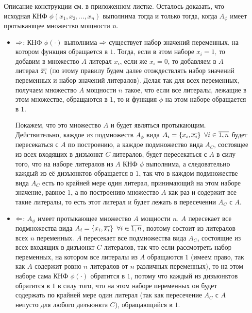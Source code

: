 \documentclass[a4paper,12pt]{article}
\begin{document}
\begin{solution}
	
	Описание конструкции см. в приложенном листке. Осталось доказать, что исходная
	КНФ $\phi(x_1, x_2, \ldots, x_n)$ выполнима тогда и только тогда, когда $A_\phi$ имеет протыкающее множество мощности $n$.
	
	\begin{itemize}
		\item $\Rightarrow$: КНФ $\phi(\cdot)$ выполнима $\Rightarrow$ существует набор значений переменных, на котором функция обращается в $1$. Тогда, если в этом наборе $x_i = 1$, то добавим в множество $A$ литерал $x_i$, если же $x_i = 0$, то добавляем в $A$ литерал $\overline{x_i}$ (по этому правилу будем далее отождествлять набор значений переменных и набор значений литералов). Делая так для всех переменных, получаем множество $A$ мощности $n$ такое, что если все литералы, лежащие в этом множестве, обращаются в $1$, то и функция $\phi$ на этом наборе обращается в $1$. 
		
		Покажем, что это множество $A$ и будет являться протыкающим. Действительно, каждое из подмножеств $A_\phi$ вида $A_i = \left\{x_i, \ol{x_i}\right\} \ \forall i \in \ol{1, n}$ будет пересекаться с $A$ по построению, а каждое подмножество вида $A_C$, состоящее из всех входящих в дизъюнкт $C$ литералов, будет пересекаться с $A$ в силу того, что на наборе литералов из $A$ КНФ $\phi$ выполнима, а следовательно каждый из её дизъюнктов обращается в $1$, так что в каждом подмножестве вида $A_C$ есть по крайней мере один литерал, принимающий на этом наборе значение, равное $1$, а по построению множество $A$ как раз и содержит все такие литералы, то есть этот литерал и будет лежать в пересечении $A_C$ с $A$.
		
		\item $\Leftarrow$: $A_\phi$ имеет протыкающее множество $A$ мощности $n$. $A$ пересекает все подмножества вида $A_i = \left\{x_i, \ol{x_i}\right\} \ \forall i \in \ol{1, n}$, поэтому состоит из литералов всех $n$ переменных. $A$ пересекает все подмножества вида $A_C$, состоящие из всех входящих в дизъюнкт $C$ литералов, так что если рассмотреть набор переменных, на котором все литералы из $A$ обращаются $1$ (имеем право, так как $A$ содержит ровно $n$ литералов от $n$ различных переменных), то на этом наборе сама КНФ $\phi(\cdot)$ обратится в $1$, потому что каждый из дизъюнктов обратится в $1$ в силу того, что на этом наборе переменных он будет содержать по крайней мере один литерал (так как пересечение $A_C$ с $A$ непусто для любого дизъюнкта $C$), обращающийся в $1$.
		
	\end{itemize}
	
	
\end{solution}
\end{document}
